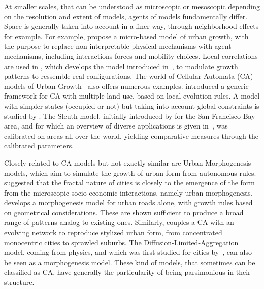 \documentclass[10pt,letterpaper,draft]{article}
\begin{document}
At smaller scales, that can be understood as microscopic or mesoscopic depending on the resolution and extent of models, agents of models fundamentally differ. Space is generally taken into account in a finer way, through neighborhood effects for example. For example, \cite{andersson2002urban} propose a micro-based model of urban growth, with the purpose to replace non-interpretable physical mechanisms with agent mechanisms, including interactions forces and mobility choices. Local correlations are used in \cite{makse1998modeling}, which develops the model introduced in~\cite{makse1995modelling}, to modulate growth patterns to ressemble real configurations. The world of Cellular Automata (CA) models of Urban Growth~\cite{batty1994cells} also offers numerous examples. \cite{GEAN:GEAN940} introduced a generic framework for CA with multiple land use, based on local evolution rules. A model with simpler states (occupied or not) but taking into account global constraints is studied by  \cite{ward2000stochastically}. The Sleuth model, initially introduced by \cite{clarke1998loose} for the San Francisco Bay area, and for which an overview of diverse applications is given in~\cite{clarke2007decade}, was calibrated on areas all over the world, yielding comparative measures through the calibrated parameters.


Closely related to CA models but not exactly similar are Urban Morphogenesis models, which aim to simulate the growth of urban form from autonomous rules. \cite{frankhauser1998fractal} suggested that the fractal nature of cities is closely to the emergence of the form from the microscopic socio-economic interactions, namely urban morphogenesis. \cite{courtat2011mathematics} develops a morphogenesis model for urban roads alone, with growth rules based on geometrical considerations. These are shown sufficient to produce a broad range of patterns analog to existing ones. Similarly, \cite{raimbault2014hybrid} couples a CA with an evolving network to reproduce stylized urban form, from concentrated monocentric cities to sprawled suburbs. The Diffusion-Limited-Aggregation model, coming from physics, and which was first studied for cities by~\cite{batty1991generating}, can also be seen as a morphogenesis model. These kind of models, that sometimes can be classified as CA, have generally the particularity of being parsimonious in their structure.
\end{document}
